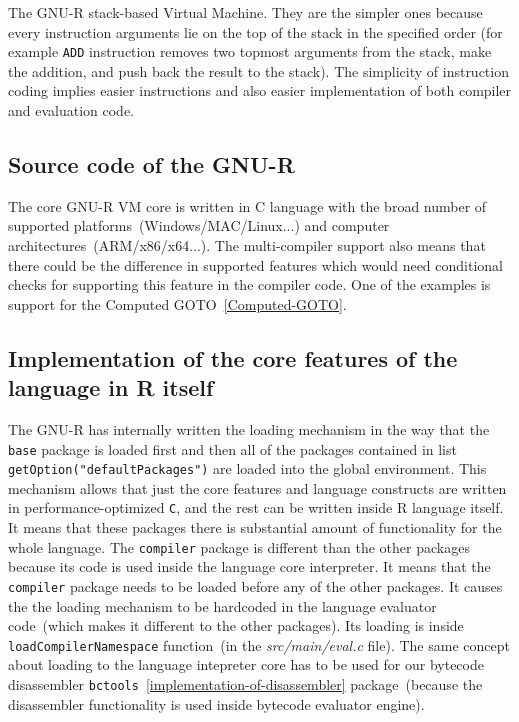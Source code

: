 \documentclass[thesis=M,english]{FITthesis}[2018/10/20]
\newcommand{\code}[1]{\texttt{#1}}
\begin{document}
The GNU-R stack-based Virtual Machine. They are the simpler ones because every instruction arguments lie on the top of the stack in the specified order (for example \code{ADD} instruction removes two topmost arguments from the stack, make the addition, and push back the result to the stack). The simplicity of instruction coding implies easier instructions and also easier implementation of both compiler and evaluation code.

\subsection{Source code of the GNU-R}\label{source-code-of-gnu-r}

The core GNU-R VM core is written in C language with the broad number of supported platforms~(Windows/MAC/Linux...) and computer architectures~(ARM/x86/x64...). The multi-compiler support also means that there could be the difference in supported features which would need conditional checks for supporting this feature in the compiler code. One of the examples is support for the Computed GOTO~\ref{Computed-GOTO}.

\subsection{Implementation of the core features of the language in R itself}

The GNU-R has internally written the loading mechanism in the way that the \code{base} package is loaded first and then all of the packages contained in list \code{getOption("defaultPackages")} are loaded into the global environment. This mechanism allows that just the core features and language constructs are written in performance-optimized \code{C}, and the rest can be written inside R language itself. It means that these packages there is substantial amount of functionality for the whole language. The \code{compiler} package is different than the other packages because its code is used inside the language core interpreter. It means that the \code{compiler} package needs to be loaded before any of the other packages. It causes the the loading mechanism to be hardcoded in the language evaluator code~(which makes it different to the other packages). Its loading is inside \code{loadCompilerNamespace} function~(in the \textit{src/main/eval.c} file). The same concept about loading to the language intepreter core has to be used for our bytecode disassembler \code{bctools}~\ref{implementation-of-disassembler} package~(because the disassembler functionality is used inside bytecode evaluator engine).
\end{document}
